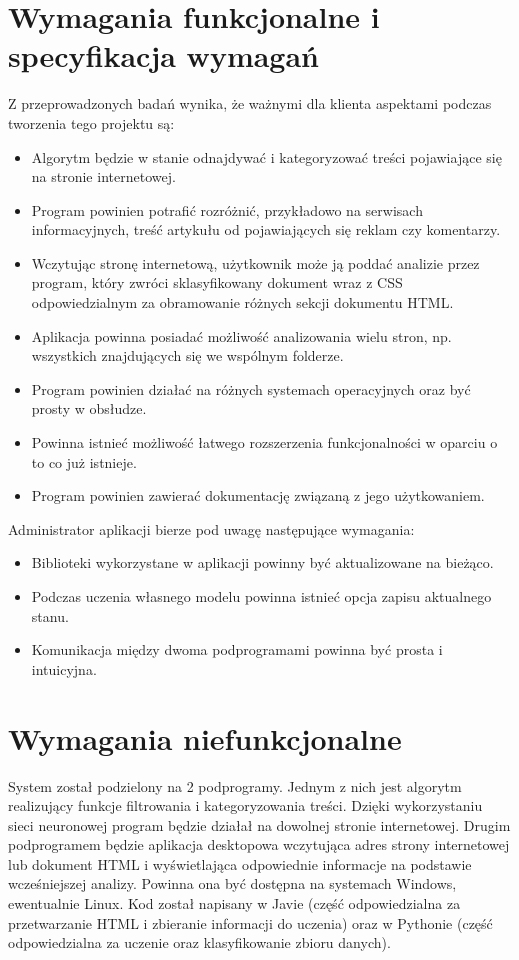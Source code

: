 \section{Wymagania funkcjonalne i specyfikacja wymagań}
\label{sec:2.2}

Z przeprowadzonych badań wynika, że ważnymi dla klienta aspektami podczas tworzenia tego projektu są:
\begin{itemize}[label=\textbullet]
\item Algorytm będzie w stanie odnajdywać i kategoryzować treści pojawiające się na stronie internetowej.
\item Program powinien potrafić rozróżnić, przykładowo na serwisach informacyjnych, treść artykułu od pojawiających się reklam czy komentarzy.
\item Wczytując stronę internetową, użytkownik może ją poddać analizie przez program, który zwróci sklasyfikowany dokument wraz z CSS odpowiedzialnym za obramowanie różnych sekcji dokumentu HTML.
\item Aplikacja powinna posiadać możliwość analizowania wielu stron, np. wszystkich znajdujących się we wspólnym folderze.
\item Program powinien działać na różnych systemach operacyjnych oraz być prosty w obsłudze.
\item Powinna istnieć możliwość łatwego rozszerzenia funkcjonalności w oparciu o to co już istnieje.
\item Program powinien zawierać dokumentację związaną z jego użytkowaniem.
\end{itemize}
Administrator aplikacji bierze pod uwagę następujące wymagania:
\begin{itemize}[label=\textbullet]
\item Biblioteki wykorzystane w aplikacji powinny być aktualizowane na bieżąco.
\item Podczas uczenia własnego modelu powinna istnieć opcja zapisu aktualnego stanu.
\item Komunikacja między dwoma podprogramami powinna być prosta i intuicyjna.
\end{itemize}


\section{Wymagania niefunkcjonalne}
\label{sec:2.3}

System został podzielony na 2 podprogramy. Jednym z nich jest algorytm realizujący funkcje filtrowania i kategoryzowania treści. Dzięki wykorzystaniu sieci neuronowej program będzie działał na dowolnej stronie internetowej. Drugim podprogramem będzie aplikacja desktopowa wczytująca adres strony internetowej lub dokument HTML i wyświetlająca odpowiednie informacje na podstawie wcześniejszej analizy. Powinna ona być dostępna na systemach Windows, ewentualnie Linux. Kod został napisany w Javie (część odpowiedzialna za przetwarzanie HTML i zbieranie informacji do uczenia) oraz w Pythonie (część odpowiedzialna za uczenie oraz klasyfikowanie zbioru danych).

